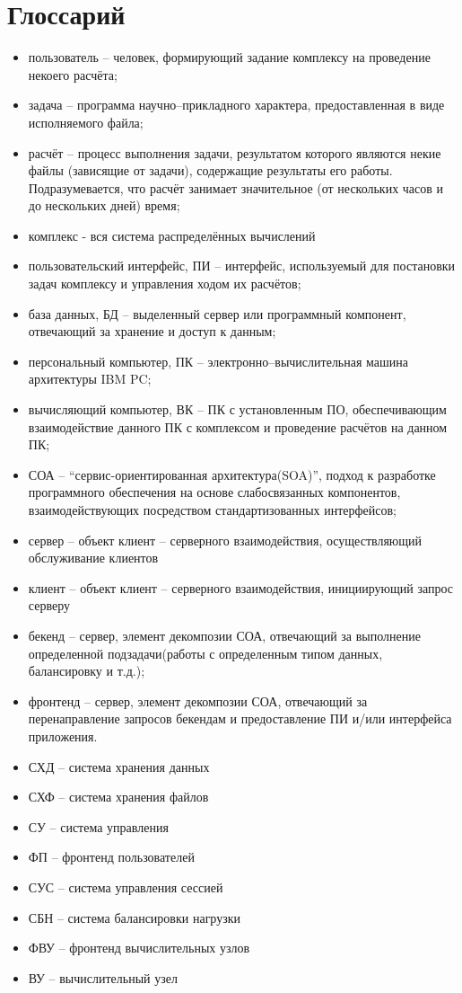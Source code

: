 \documentclass[a4paper,12pt]{report}
\date{\today}
\numberwithin{equation}{section}
\begin{document}
  
  \tableofcontents
  
  \clearpage
  \section*{Глоссарий}
  \begin{itemize}
    \item пользователь -- человек, формирующий задание комплексу на проведение некоего расчёта;
    \item задача -- программа научно--прикладного характера, предоставленная в виде исполняемого файла;
    \item расчёт -- процесс выполнения задачи, результатом которого являются некие файлы (зависящие от задачи), содержащие результаты его работы. Подразумевается, что расчёт занимает значительное (от нескольких часов и до нескольких дней) время;
    \item комплекс - вся система распределённых вычислений
    \item пользовательский интерфейс, ПИ -- интерфейс, используемый для постановки задач комплексу и управления ходом их расчётов;
    \item база данных, БД -- выделенный сервер или программный компонент, отвечающий за хранение и доступ к данным;
    \item персональный компьютер, ПК -- электронно--вычислительная машина архитектуры IBM PC;
    \item вычисляющий компьютер, ВК -- ПК с установленным ПО, обеспечивающим взаимодействие данного ПК с комплексом и проведение расчётов на данном ПК;
    \item СОА -- ``сервис-ориентированная архитектура(SOA)'', подход к разработке программного обеспечения на основе слабосвязанных компонентов, взаимодействующих посредством стандартизованных интерфейсов;
    \item сервер -- объект клиент -- серверного взаимодействия, осуществляющий обслуживание клиентов
    \item клиент -- объект клиент -- серверного взаимодействия, инициирующий запрос серверу
    \item бекенд -- сервер, элемент декомпозии СОА, отвечающий за выполнение определенной подзадачи(работы с определенным типом данных, балансировку и т.д.);
    \item фронтенд -- сервер, элемент декомпозии СОА, отвечающий за перенаправление запросов бекендам и предоставление ПИ и/или интерфейса приложения.
    \item СХД -- система хранения данных
    \item СХФ -- система хранения файлов
    \item СУ -- система управления
    \item ФП -- фронтенд пользователей
    \item СУС -- система управления сессией
    \item СБН -- система балансировки нагрузки
    \item ФВУ -- фронтенд вычислительных узлов
    \item ВУ -- вычислительный узел
  \end{itemize}
  
\end{document}
